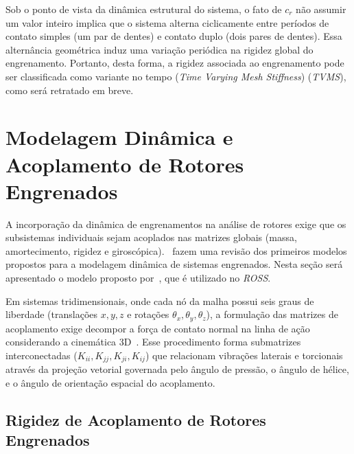 Sob o ponto de vista da dinâmica estrutural do sistema, o fato de $c_r$ não assumir um valor inteiro implica que o sistema alterna ciclicamente entre períodos de contato simples (um par de dentes) e contato duplo (dois pares de dentes). Essa alternância geométrica induz uma variação periódica na rigidez global do engrenamento. Portanto, desta forma, a rigidez associada ao engrenamento pode ser classificada como variante no tempo (\textit{Time Varying Mesh Stiffness}) (\textit{TVMS}), como será retratado em breve.
 
\section{Modelagem Dinâmica e Acoplamento de Rotores Engrenados}
A incorporação da dinâmica de engrenamentos na análise de rotores exige que os subsistemas individuais sejam acoplados nas matrizes globais (massa, amortecimento, rigidez e giroscópica).~ fazem uma revisão dos primeiros modelos propostos para a modelagem dinâmica de sistemas engrenados. Nesta seção será apresentado o modelo proposto por~, que é utilizado no \textit{ROSS}.

Em sistemas tridimensionais, onde cada nó da malha possui seis graus de liberdade (translações $x, y, z$ e rotações $\theta_x, \theta_y, \theta_z$), a formulação das matrizes de acoplamento exige decompor a força de contato normal na linha de ação considerando a cinemática 3D~\cite{stringer2008}. Esse procedimento forma submatrizes interconectadas ($K_{ii}, K_{jj}, K_{ji}, K_{ij}$) que relacionam vibrações laterais e torcionais através da projeção vetorial governada pelo ângulo de pressão, o ângulo de hélice, e o ângulo de orientação espacial do acoplamento.

\subsection{Rigidez de Acoplamento de Rotores Engrenados}

